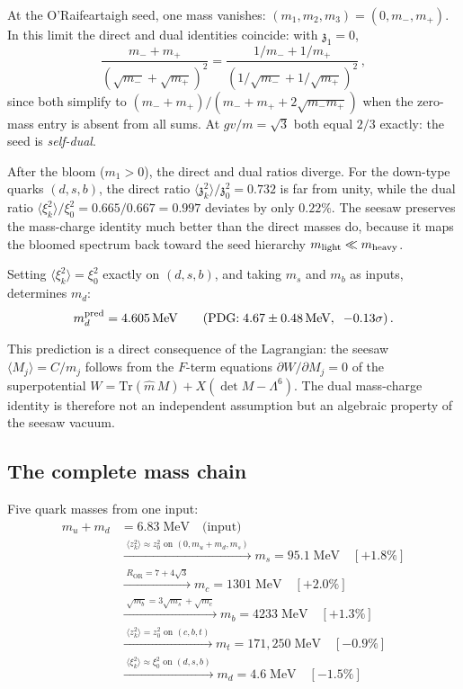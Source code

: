 \documentclass[12pt,a4paper]{article}
\newcommand{\MeV}{\,\text{MeV}}
\newcommand{\zch}{\mathfrak{z}}
\begin{document}
At the O'Raifeartaigh seed, one mass vanishes:
$(m_1,m_2,m_3) = (0,m_-,m_+)$. In this limit the direct and dual
identities coincide: with $\zch_1 = 0$,
\begin{equation}
  \frac{m_- + m_+}{(\sqrt{m_-}+\sqrt{m_+})^2}
  = \frac{1/m_- + 1/m_+}{(1/\sqrt{m_-}+1/\sqrt{m_+})^2}\,,
\end{equation}
since both simplify to $(m_- + m_+)/(m_- + m_+ + 2\sqrt{m_- m_+})$
when the zero-mass entry is absent from all sums.
At $gv/m = \sqrt{3}$ both equal $2/3$ exactly: the seed is
\emph{self-dual}.

After the bloom ($m_1 > 0$), the direct and dual ratios diverge.
For the down-type quarks $(d,s,b)$, the direct ratio
$\langle\zch_k^2\rangle/\zch_0^2 = 0.732$ is far from unity,
while the dual ratio
$\langle\xi_k^2\rangle/\xi_0^2 = 0.665/0.667 = 0.997$
deviates by only $0.22\%$.
The seesaw preserves the mass-charge identity much better than
the direct masses do, because it maps the bloomed spectrum back
toward the seed hierarchy $m_{\rm light} \ll m_{\rm heavy}$.

Setting $\langle\xi_k^2\rangle = \xi_0^2$ exactly on $(d,s,b)$,
and taking $m_s$ and $m_b$ as inputs, determines $m_d$:
\begin{equation}
  m_d^{\rm pred} = 4.605\MeV
  \qquad(\text{PDG:}\; 4.67 \pm 0.48\MeV,\;\; -0.13\sigma)\,.
\end{equation}

This prediction is a direct consequence of the Lagrangian:
the seesaw $\langle M_j\rangle = C/m_j$ follows from the
$F$-term equations $\partial W/\partial M_j = 0$
of the superpotential
$W = \mathrm{Tr}(\hat m\,M) + X(\det M - \Lambda^6)$.
The dual mass-charge identity is therefore not an independent
assumption but an algebraic property of the seesaw vacuum.

\subsection{The complete mass chain}

Five quark masses from one input:
\begin{equation}
\boxed{
\begin{aligned}
m_u + m_d &= 6.83\;\mathrm{MeV} \quad\text{(input)}\\[4pt]
&\xrightarrow{\;\langle z_k^2\rangle \approx z_0^2\text{ on }(0,m_u{+}m_d,m_s)\;}
m_s = 95.1\;\mathrm{MeV} \quad[+1.8\%]\\[4pt]
&\xrightarrow{\;R_{\mathrm{OR}} = 7 + 4\sqrt{3}\;}
m_c = 1301\;\mathrm{MeV} \quad[+2.0\%]\\[4pt]
&\xrightarrow{\;\sqrt{m_b} = 3\sqrt{m_s} + \sqrt{m_c}\;}
m_b = 4233\;\mathrm{MeV} \quad[+1.3\%]\\[4pt]
&\xrightarrow{\;\langle z_k^2\rangle = z_0^2\text{ on }(c,b,t)\;}
m_t = 171{,}250\;\mathrm{MeV} \quad[-0.9\%]\\[4pt]
&\xrightarrow{\;\langle\xi_k^2\rangle \approx \xi_0^2\text{ on }(d,s,b)\;}
m_d = 4.6\;\mathrm{MeV} \quad[-1.5\%]
\end{aligned}
}
\end{equation}
\end{document}
